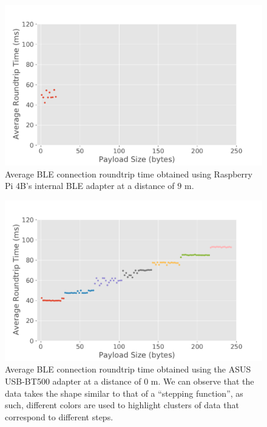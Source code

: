 \begin{figure}[H]
    \centering
    \includegraphics[width=0.75\linewidth]{images/ble-roundtrip-hci1-900cm.pdf}
    \caption[Average \acs{BLE} connection roundtrip time obtained using Raspberry Pi 4B's internal \acs{BLE} adapter at a distance of 9 m.]{Average \acs{BLE} connection roundtrip time obtained using Raspberry Pi 4B's internal \acs{BLE} adapter at a distance of $9\text{ m}$.}
    \label{fig:ble-roundtrip-hci1-9m}
\end{figure}

\begin{figure}[H]
    \centering
    \includegraphics[width=0.75\linewidth]{images/ble-roundtrip-hci0-0cm.pdf}
    \caption[Average \acs{BLE} connection roundtrip time obtained using the ASUS USB-BT500 adapter at a distance of 0 m.]{Average \acs{BLE} connection roundtrip time obtained using the ASUS USB-BT500 adapter at a distance of $0\text{ m}$. We can observe that the data takes the shape similar to that of a ``stepping function'', as such, different colors are used to highlight clusters of data that correspond to different steps.}
    \label{fig:ble-roundtrip-hci0-0m}
\end{figure}

